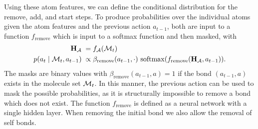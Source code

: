 Using these atom features, we can define the conditional distribution for the remove, add, and start steps.
To produce probabilities over the individual atoms given the atom features and the previous action $a_{t-1}$,
both are input to a function $f_{\textrm{remove}}$ which is input to a softmax function and then masked, with
\begin{align}
{\mathbf{H}}_{{\mathcal{A}}} \;&= f_{{\mathcal{A}}}({\mathcal{M}}_t) \label{eq:rem_atom} \\
p(a_t \mid {\mathcal{M}}_{t}, a_{t-1}) 
\;&\propto \beta_{\mathrm{remove}}(a_{t-1}, \cdot) \  \mathrm{softmax}(f_{\textrm{remove}}({\mathbf{H}}_{{\mathcal{A}}}, a_{t-1})). \label{eq:rem_prob}
\end{align}
The masks are binary values with $\beta_{\mathrm{remove}}({a_{t-1}, a}) = 1$ if the bond $(a_{t-1}, a)$ exists in the molecule set ${\mathcal{M}}_t$.
In this manner, the previous action can be used to mask the possible probabilities, as it is structurally impossible to remove a bond which does not exist.
The function $f_{\textrm{remove}}$ is defined as a neural network with a single hidden layer.
When removing the initial bond we also allow the removal of self bonds.


%
%

